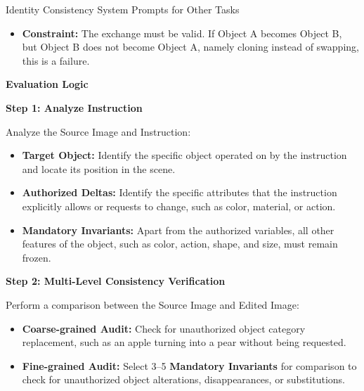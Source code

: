 \begin{promptbox}[label={System Prompts: IC_Other_Tasks}]{Identity Consistency System Prompts for Other Tasks}
\begin{enumerate}[label=\arabic*., leftmargin=2.2em, labelsep=0.5em, itemsep=2pt]
    \begin{itemize}[leftmargin=2.2em, labelsep=0.5em, itemsep=2pt]
        \item \textbf{Constraint:} The exchange must be valid. If Object A becomes Object B, but Object B does not become Object A, namely cloning instead of swapping, this is a failure.
    \end{itemize}
\end{enumerate}

\medskip

\textbf{Evaluation Logic}

\medskip

\textbf{Step 1: Analyze Instruction}

Analyze the Source Image and Instruction:

\begin{itemize}[leftmargin=2.2em, labelsep=0.5em, itemsep=2pt]
    \item \textbf{Target Object:} Identify the specific object operated on by the instruction and locate its position in the scene.
    
    \item \textbf{Authorized Deltas:} Identify the specific attributes that the instruction explicitly allows or requests to change, such as color, material, or action.
    
    \item \textbf{Mandatory Invariants:} Apart from the authorized variables, all other features of the object, such as color, action, shape, and size, must remain frozen.
\end{itemize}

\medskip

\textbf{Step 2: Multi-Level Consistency Verification}

Perform a comparison between the Source Image and Edited Image:

\begin{itemize}[leftmargin=2.2em, labelsep=0.5em, itemsep=2pt]
    \item \textbf{Coarse-grained Audit:} Check for unauthorized object category replacement, such as an apple turning into a pear without being requested.
    
    \item \textbf{Fine-grained Audit:} Select 3--5 \textbf{Mandatory Invariants} for comparison to check for unauthorized object alterations, disappearances, or substitutions.
\end{itemize}


\end{promptbox}
